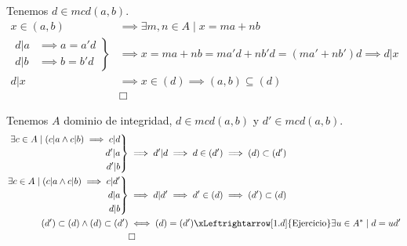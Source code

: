 \begin{solution}

Tenemos $d \in mcd(a,b)$.
\begin{align}
x \in (a,b) &\implies \exists m,n \in A \mid x = ma + nb \\
\left.\begin{aligned}
       d|a &\implies a=a'd\\
       d|b &\implies b=b'd
      \end{aligned}
\right\}
&\implies x = ma + nb = ma'd + nb'd = (ma' + nb')d \implies d|x\\
d|x &\implies x \in (d) \implies (a,b) \subseteq (d)\\
&\Box
\end{align}

Tenemos $A$ dominio de integridad, $d \in mcd(a,b)$ y $d'\in mcd(a,b)$.
\begin{align}
\left.\begin{aligned}
       \exists c \in A \mid (c|a \wedge c|b) \implies c|d \\
       d'|a \\
       d'|b
      \end{aligned}
\right\}
&\implies d'|d \implies d \in (d') \implies (d) \subset (d')\\
\left.\begin{aligned}
       \exists c \in A \mid (c|a \wedge c|b) \implies c|d' \\
       d|a \\
       d|b
      \end{aligned}
\right\}
&\implies d|d' \implies d' \in (d) \implies (d') \subset (d)\\
(d') \subset (d) \land (d) \subset (d') &\iff (d) = (d')
\xLeftrightarrow[1.d]{\text{Ejercicio}} \exists u \in A^* \mid d=ud'\\
&\Box
\end{align}


\end{solution}

